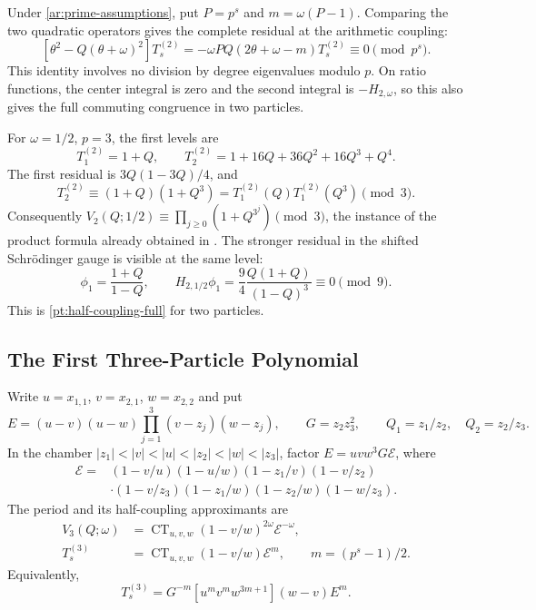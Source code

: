 \documentclass[11pt]{amsart}
\theoremstyle{definition}
\theoremstyle{remark}
\numberwithin{equation}{section}
\DeclareMathOperator{\CT}{CT}
\begin{document}
Under \eqref{ar:prime-assumptions}, put $P=p^s$ and
$m=\omega(P-1)$. Comparing the two quadratic operators gives
the complete residual at the arithmetic coupling:
\begin{equation}\label{ex:two-particle-residual}
 [\theta^2-Q(\theta+\omega)^2]T_s^{(2)}
 =-\omega P Q(2\theta+\omega-m)T_s^{(2)}
 \equiv0\pmod{p^s}.
\end{equation}
This identity involves no division by degree eigenvalues modulo
$p$. On ratio functions, the center integral is zero and the
second integral is $-H_{2,\omega}$, so this also gives the full
commuting congruence in two particles.

For $\omega=1/2$, $p=3$, the first levels are
\begin{equation}\label{ex:two-particle-levels}
 T_1^{(2)}=1+Q,\qquad
 T_2^{(2)}=1+16Q+36Q^2+16Q^3+Q^4.
\end{equation}
The first residual is $3Q(1-3Q)/4$, and
\[
 T_2^{(2)}\equiv(1+Q)(1+Q^3)
 =T_1^{(2)}(Q)T_1^{(2)}(Q^3)\pmod3.
\]
Consequently
$V_2(Q;1/2)\equiv\prod_{j\geq0}(1+Q^{3^j})\pmod3$,
the instance of the product formula already obtained in
\cite{SV23}. The stronger residual in the shifted
Schr\"odinger gauge is visible at the same level:
\begin{equation}\label{ex:two-particle-shifted}
 \phi_1=\frac{1+Q}{1-Q},\qquad
 H_{2,1/2}\phi_1=\frac94\frac{Q(1+Q)}{(1-Q)^3}
 \equiv0\pmod9.
\end{equation}
This is \eqref{pt:half-coupling-full} for two particles.

\subsection{The First Three-Particle Polynomial}
Write $u=x_{1,1}$, $v=x_{2,1}$, $w=x_{2,2}$ and put
\begin{equation}\label{fl:edge-polynomial}
 E=(u-v)(u-w)\prod_{j=1}^3(v-z_j)(w-z_j),\qquad
 G=z_2z_3^2,\qquad Q_1=z_1/z_2,\quad Q_2=z_2/z_3.
\end{equation}
In the chamber
$|z_1|<|v|<|u|<|z_2|<|w|<|z_3|$, factor
$E=uvw^3G\mathscr E$, where
\begin{equation}\label{fl:chamber-edges}
\begin{split}
 \mathscr E={}&(1-v/u)(1-u/w)(1-z_1/v)(1-v/z_2)\\
 &\cdot(1-v/z_3)(1-z_1/w)(1-z_2/w)(1-w/z_3).
\end{split}
\end{equation}
The period and its half-coupling approximants are
\begin{align}
 V_3(Q;\omega)&=\CT_{u,v,w}
 (1-v/w)^{2\omega}\mathscr E^{-\omega},\label{fl:period}\\
 T_s^{(3)}&=\CT_{u,v,w}(1-v/w)\mathscr E^m,
 \qquad m=(p^s-1)/2.\label{fl:finite-constant-term}
\end{align}
Equivalently,
\begin{equation}\label{fl:finite-extraction}
 T_s^{(3)}=G^{-m}[u^mv^mw^{3m+1}](w-v)E^m.
\end{equation}
\end{document}
